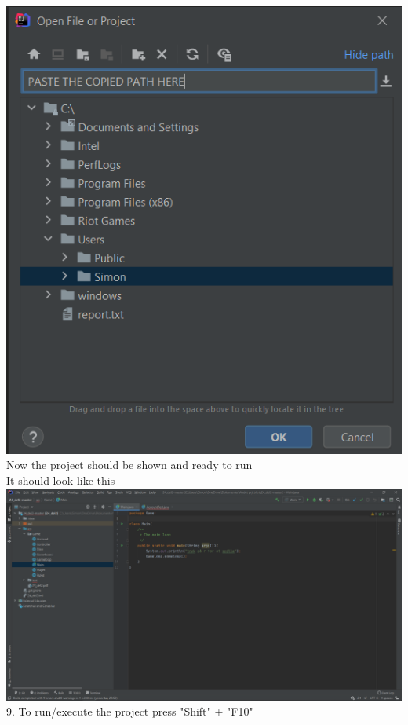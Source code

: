 \begin{flushleft}
    \includegraphics[width=16.5cm]{Report/root/step4.png}\\
    Now the project should be shown and ready to run\\
    \newpage
    It should look like this\\
    \vspace{5mm}
    \includegraphics[width=16.5cm]{Report/root/step5.png}\\
    9. To run/execute the project press "Shift" + "F10"

    
    
\end{flushleft}
